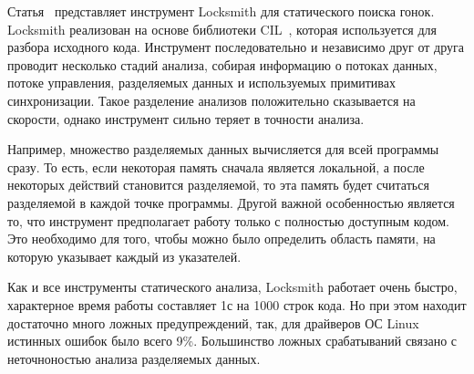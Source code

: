 Статья~\cite{Pratikakis:2011} представляет инструмент Locksmith для статического поиска гонок.
Locksmith реализован на основе библиотеки CIL~\cite{CIL}, которая используется для разбора исходного кода.
Инструмент последовательно и независимо друг от друга проводит несколько стадий анализа, собирая информацию о потоках данных, потоке управления, разделяемых данных и используемых примитивах синхронизации.
Такое разделение анализов положительно сказывается на скорости, однако инструмент сильно теряет в точности анализа.

Например, множество разделяемых данных вычисляется для всей программы сразу. 
То есть, если некоторая память сначала является локальной, а после некоторых действий становится разделяемой, то эта память будет считаться разделяемой в каждой точке программы.
Другой важной особенностью является то, что инструмент предполагает работу только с полностью доступным кодом.
Это необходимо для того, чтобы можно было определить область памяти, на которую указывает каждый из указателей.

Как и все инструменты статического анализа, Locksmith работает очень быстро, характерное время работы составляет 1с на 1000 строк кода.
Но при этом находит достаточно много ложных предупреждений, так, для драйверов ОС Linux истинных ошибок было всего 9\%.
Большинство ложных срабатываний связано с неточноностью анализа разделяемых данных.

